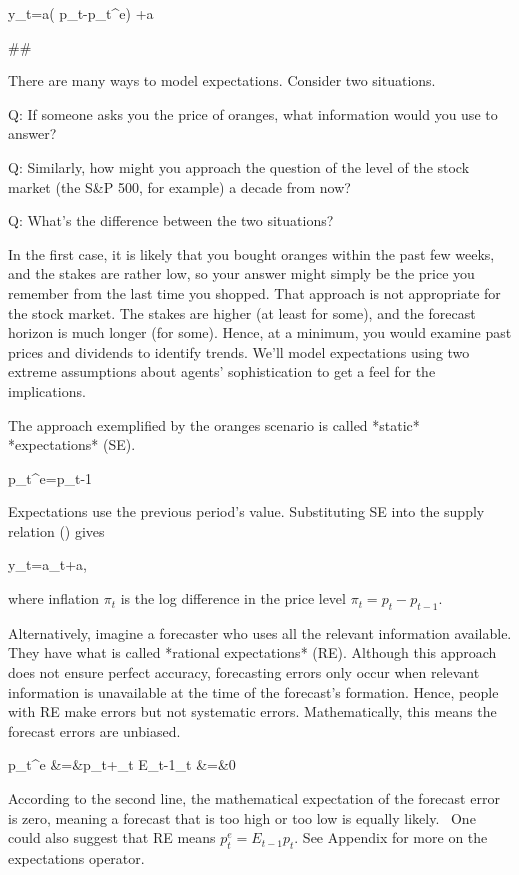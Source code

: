 ﻿\documentclass[oneside]{book}
\begin{document}
y_{t}=a( p_{t}-p_{t}^{e}) +a\log \beta






##



There are many ways to model expectations. Consider two situations.

Q:  If someone asks you the price of oranges, what information would you use
to answer?

Q: Similarly, how might you approach the question of the level of the stock market (the S\&P 500, for example) a decade from now?

Q: What's the difference between the two situations?

In the first case, it is likely that you bought oranges within the past few weeks, and the stakes are rather low, so your answer might simply be the price you remember from the last time you shopped. That approach is not
appropriate for the stock market. The stakes are higher (at least
for some), and the forecast horizon is much longer (for some). Hence, at a
minimum, you would examine past prices and dividends to identify trends. We'll model expectations using two extreme assumptions about agents' sophistication to
get a feel for the implications.

The approach exemplified by the oranges scenario is called *static*
*expectations* (SE).



p_{t}^{e}=p_{t-1}


Expectations use the previous period's value. Substituting SE into the supply relation () gives



y_{t}=a\pi _{t}+a\log \beta ,


where inflation $\pi _{t}$ is the log difference in the price level $\pi
_{t}=p_{t}-p_{t-1}.$

Alternatively, imagine a forecaster who uses all the relevant information
available. They have what is called *rational expectations* (RE). Although this approach does not ensure perfect accuracy, forecasting errors only occur when
relevant information is unavailable at the time of the forecast's formation. Hence, people with RE make errors but not systematic errors.
Mathematically, this means the forecast errors are unbiased.



p_{t}^{e} &=&p_{t}+\varepsilon _{t}
E_{t-1}\varepsilon _{t} &=&0


According to the second line, the mathematical expectation of the forecast error is zero, meaning a forecast that is too high or too low is equally likely. \
One could also suggest that RE means $p_{t}^{e}=E_{t-1}p_{t}$. See Appendix  for more on the expectations operator.
\end{document}
